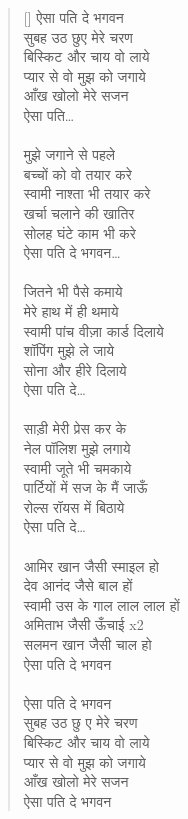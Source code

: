 \begin{verse}[\versewidth]\texthindi{
ऐसा पति दे भगवन\\
सुबह उठ छुए मेरे चरण\\
बिस्किट और चाय वो लाये\\
प्यार से वो मुझ को जगाये\\
आँख खोलो मेरे सजन\\
ऐसा पति…\\
\\
मुझे जगाने से पहले\\
बच्चों को वो तयार करे\\
स्वामी नाश्ता भी तयार करे\\
खर्चा चलाने की खातिर\\
सोलह घंटे काम भी करे\\
ऐसा पति दे भगवन…\\
\\
जितने भी पैसे कमाये\\
मेरे हाथ में ही थमाये\\
स्वामी पांच वीज़ा कार्ड दिलाये\\
शॉपिंग मुझे ले जाये\\
सोना और हीरे दिलाये\\
ऐसा पति दे…\\
\\
साड़ी मेरी प्रेस कर के\\
नेल पॉलिश मुझे लगाये\\
स्वामी जूते भी चमकाये\\
पार्टियों में सज के मैं जाऊँ\\
रोल्स रॉयस में बिठाये\\
ऐसा पति दे…\\
\\
आमिर खान जैसी स्माइल हो\\
देव आनंद जैसे बाल हों\\
स्वामी उस के गाल लाल लाल हों\\
अमिताभ जैसी ऊँचाई
}x\texthindi{2\\
सलमन खान जैसी चाल हो\\
ऐसा पति दे भगवन\\
\\
ऐसा पति दे भगवन\\
सुबह उठ छु ए मेरे चरण\\
बिस्किट और चाय वो लाये\\
प्यार से वो मुझ को जगाये\\
आँख खोलो मेरे सजन\\
ऐसा पति दे भगवन\\
}\end{verse}

